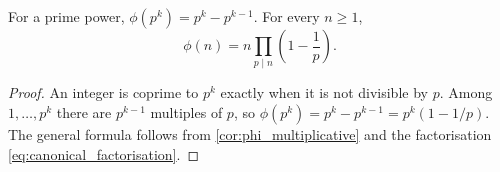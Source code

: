 \begin{proposition}\label{prop:phi_formula}
    For a prime power, $\phi(p^k) = p^k - p^{k-1}$. For every $n \ge 1$,
    \begin{equation*}
        \phi(n) = n \prod_{p \mid n}\left(1 - \frac{1}{p}\right).
    \end{equation*}
\end{proposition}
\begin{proof}
    An integer is coprime to $p^k$ exactly when it is not divisible by $p$. Among $1, \dots, p^k$ there are $p^{k-1}$ multiples of $p$, so $\phi(p^k) = p^k - p^{k-1} = p^k(1 - 1/p)$. The general formula follows from \cref{cor:phi_multiplicative} and the factorisation \cref{eq:canonical_factorisation}.
\end{proof}
